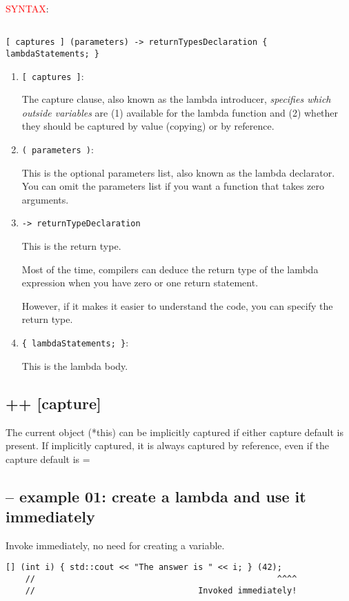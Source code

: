 \textcolor{red}{SYNTAX}:
\begin{verbatim}

[ captures ] (parameters) -> returnTypesDeclaration { lambdaStatements; }

\end{verbatim}
\begin{enumerate}
  
  \item  \verb![ captures ]!: 
  
  The capture clause, also known as the lambda introducer, {\it specifies which
  outside variables} are (1) available for the lambda function and (2) whether they
  should be captured by value (copying) or by reference.
  
  \item \verb!( parameters )!:
  
   This is the optional parameters list, also known as the lambda declarator. 
    You can omit the parameters list if you want a function that takes zero arguments.
  

  \item  \verb!-> returnTypeDeclaration!
  
  This is the return type.
  
  Most of the time, compilers can deduce the return type of the lambda expression when you have zero or one return statement.
  
  However, if it makes it easier to understand the code, you can specify the return type. 
  
  \item \verb!{ lambdaStatements; }!: 
  
  This is the lambda body.
\end{enumerate}

\subsection{++ [capture]}

The current object (*this) can be implicitly captured if either capture default
is present. If implicitly captured, it is always captured by reference, even if
the capture default is =


\subsection{-- example 01: create a lambda and use it immediately}


Invoke immediately, no need for creating a variable.
\begin{lstlisting}
[] (int i) { std::cout << "The answer is " << i; } (42);
    //                                                 ^^^^
    //                                 Invoked immediately!
    
\end{lstlisting}

